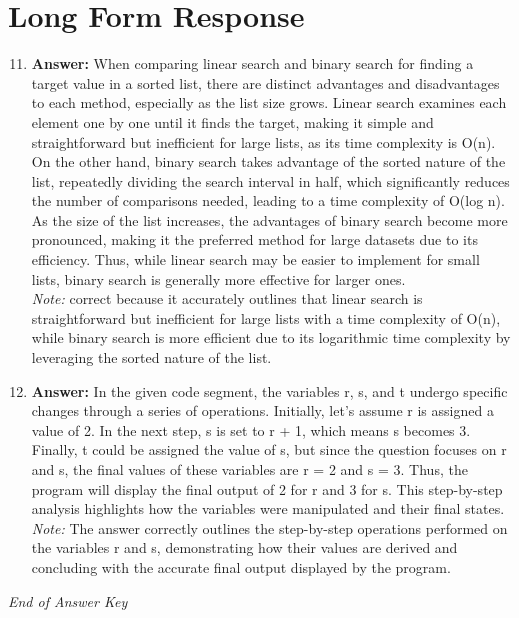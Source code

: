 \documentclass[12pt]{article}
\begin{document}
\section*{Long Form Response}
\begin{enumerate}[label=\arabic*.]
\setcounter{enumi}{10}
\item \textbf{Answer:} When comparing linear search and binary search for finding a target value in a sorted list, there are distinct advantages and disadvantages to each method, especially as the list size grows. Linear search examines each element one by one until it finds the target, making it simple and straightforward but inefficient for large lists, as its time complexity is O(n). On the other hand, binary search takes advantage of the sorted nature of the list, repeatedly dividing the search interval in half, which significantly reduces the number of comparisons needed, leading to a time complexity of O(log n). As the size of the list increases, the advantages of binary search become more pronounced, making it the preferred method for large datasets due to its efficiency. Thus, while linear search may be easier to implement for small lists, binary search is generally more effective for larger ones.
\\ \textit{Note:} correct because it accurately outlines that linear search is straightforward but inefficient for large lists with a time complexity of O(n), while binary search is more efficient due to its logarithmic time complexity by leveraging the sorted nature of the list.
\item \textbf{Answer:} In the given code segment, the variables r, s, and t undergo specific changes through a series of operations. Initially, let's assume r is assigned a value of 2. In the next step, s is set to r + 1, which means s becomes 3. Finally, t could be assigned the value of s, but since the question focuses on r and s, the final values of these variables are r = 2 and s = 3. Thus, the program will display the final output of 2 for r and 3 for s. This step-by-step analysis highlights how the variables were manipulated and their final states.
\\ \textit{Note:} The answer correctly outlines the step-by-step operations performed on the variables r and s, demonstrating how their values are derived and concluding with the accurate final output displayed by the program.
\end{enumerate}

\vfill
\noindent\textit{End of Answer Key}
\end{document}
